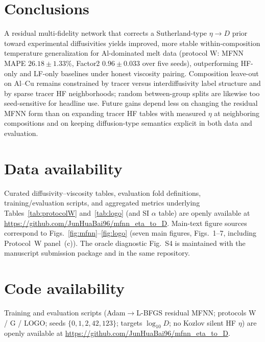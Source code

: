 \documentclass[review,12pt]{elsarticle}
\begin{document}
\section{Conclusions}
\label{sec:conclusions}

A residual multi-fidelity network that corrects a Sutherland-type $\eta\to D$ prior toward experimental diffusivities yields improved, more stable within-composition temperature generalization for Al-dominated melt data (protocol W: MFNN MAPE $26.18\pm 1.33\%$, Factor2 $0.96\pm 0.033$ over five seeds), outperforming HF-only and LF-only baselines under honest viscosity pairing. Composition leave-out on Al--Cu remains constrained by tracer versus interdiffusivity label structure and by sparse tracer HF neighborhoods; random between-group splits are likewise too seed-sensitive for headline use. Future gains depend less on changing the residual MFNN form than on expanding tracer HF tables with measured $\eta$ at neighboring compositions and on keeping diffusion-type semantics explicit in both data and evaluation.

\section*{Data availability}

Curated diffusivity--viscosity tables, evaluation fold definitions, training/evaluation scripts, and aggregated metrics underlying Tables~\ref{tab:protocolW} and~\ref{tab:logo} (and SI $\alpha$ table) are openly available at \url{https://github.com/JunHuaBai96/mfnn_eta_to_D}. Main-text figure sources correspond to Figs.~\ref{fig:mfnn}--\ref{fig:logo} (seven main figures, Figs.~1--7, including Protocol~W panel~(c)). The oracle diagnostic Fig.~S4 is maintained with the manuscript submission package and in the same repository.

\section*{Code availability}

Training and evaluation scripts (Adam$\to$L-BFGS residual MFNN; protocols W / G / LOGO; seeds $\{0,1,2,42,123\}$; targets $\log_{10} D$; no Kozlov silent HF $\eta$) are openly available at \url{https://github.com/JunHuaBai96/mfnn_eta_to_D}.




\end{document}
